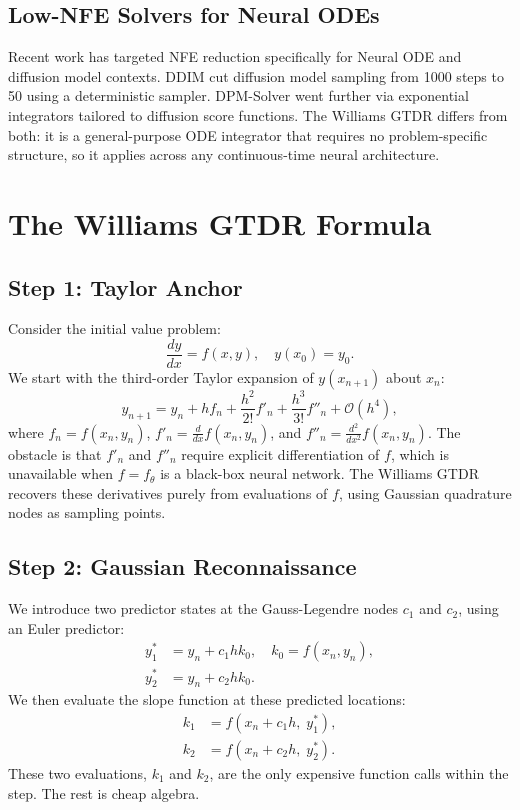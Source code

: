 \documentclass[conference]{IEEEtran}
\begin{document}
\subsection{Low-NFE Solvers for Neural ODEs}

Recent work has targeted NFE reduction specifically for Neural ODE and
diffusion model contexts. DDIM \cite{song2020ddim} cut diffusion model
sampling from 1000 steps to 50 using a deterministic sampler. DPM-Solver
\cite{lu2022dpm} went further via exponential integrators tailored to
diffusion score functions. The Williams GTDR differs from both: it is a
general-purpose ODE integrator that requires no problem-specific
structure, so it applies across any continuous-time neural architecture.

\section{The Williams GTDR Formula}
\label{sec:derivation}

\subsection{Step 1: Taylor Anchor}

Consider the initial value problem:
%
\begin{equation}
    \frac{dy}{dx} = f(x, y), \quad y(x_0) = y_0.
\end{equation}
%
We start with the third-order Taylor expansion of $y(x_{n+1})$ about
$x_n$:
%
\begin{equation}
    \label{eq:taylor}
    y_{n+1} = y_n + h f_n + \frac{h^2}{2!} f'_n + \frac{h^3}{3!} f''_n
    + \mathcal{O}(h^4),
\end{equation}
%
where $f_n = f(x_n, y_n)$, $f'_n = \frac{d}{dx}f(x_n, y_n)$, and
$f''_n = \frac{d^2}{dx^2}f(x_n, y_n)$. The obstacle is that $f'_n$ and
$f''_n$ require explicit differentiation of $f$, which is unavailable
when $f = f_\theta$ is a black-box neural network. The Williams GTDR
recovers these derivatives purely from evaluations of $f$, using
Gaussian quadrature nodes as sampling points.

\subsection{Step 2: Gaussian Reconnaissance}

We introduce two predictor states at the Gauss-Legendre nodes $c_1$ and
$c_2$, using an Euler predictor:
%
\begin{align}
    \label{eq:predictors}
    y_1^* &= y_n + c_1 h k_0, \quad k_0 = f(x_n, y_n), \\
    y_2^* &= y_n + c_2 h k_0.
\end{align}
%
We then evaluate the slope function at these predicted locations:
%
\begin{align}
    k_1 &= f(x_n + c_1 h,\; y_1^*), \\
    k_2 &= f(x_n + c_2 h,\; y_2^*).
\end{align}
%
These two evaluations, $k_1$ and $k_2$, are the only expensive function
calls within the step. The rest is cheap algebra.
\end{document}

